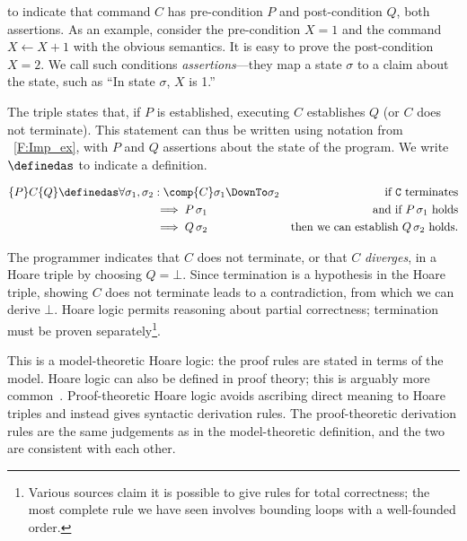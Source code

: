 to indicate that command \(C\) has pre-condition \(P\) and post-condition \(Q\),
both assertions. As an example, consider
the pre-condition \(X = 1\) and the command \(X \gets X + 1\) with the obvious
semantics. It is easy to prove the post-condition \(X = 2\). We call such
conditions \emph{assertions}---they map a state \(\sigma\) to a claim about the
state, such as ``In state \(\sigma\), \(X\) is 1.''

The triple states that, if \(P\) is established, executing \(C\) establishes
\(Q\) (or \(C\) does not terminate). This statement can thus be written using
notation from \figurename~\ref{F:Imp_ex}, with \(P\) and \(Q\) assertions about
the state of the program. We write \(\definedas\) to indicate a definition.

\begin{align*}
    \{P\} C \{Q\} \definedas \forall \sigma_1, \sigma_2 &: \comp{C}\sigma_1 \DownTo \sigma_2 &\text{if \(\mathtt{C}\) terminates} \\
    &\implies P\, \sigma_1 &\text{and if \(P\, \sigma_1\) holds} \\
    &\implies Q\, \sigma_2 &\text{then we can establish \(Q\, \sigma_2\) holds.}
\end{align*}

The programmer indicates that \(C\) does not terminate, or that \(C\)
\emph{diverges}, in a Hoare triple by choosing \(Q = \bot\). Since termination
is a hypothesis in the Hoare triple, showing \(C\) does not terminate leads to a
contradiction, from which we can derive \(\bot\). Hoare logic permits reasoning
about partial correctness; termination must be proven
separately\footnote{Various sources claim it is possible to give rules for total
correctness; the most complete rule we have seen involves bounding loops with a
well-founded order.}.

This is a model-theoretic Hoare logic: the proof rules are stated in terms of
the model. Hoare logic can also be defined in proof theory; this is arguably
more common~\cite[Ch.\ \emph{Hoare Logic as a Logic}]{Pierce:SF2}.
Proof-theoretic Hoare logic avoids ascribing direct meaning to Hoare triples and
instead gives syntactic derivation rules. The proof-theoretic derivation rules
are the same judgements as in the model-theoretic definition, and the two are
consistent with each other.

